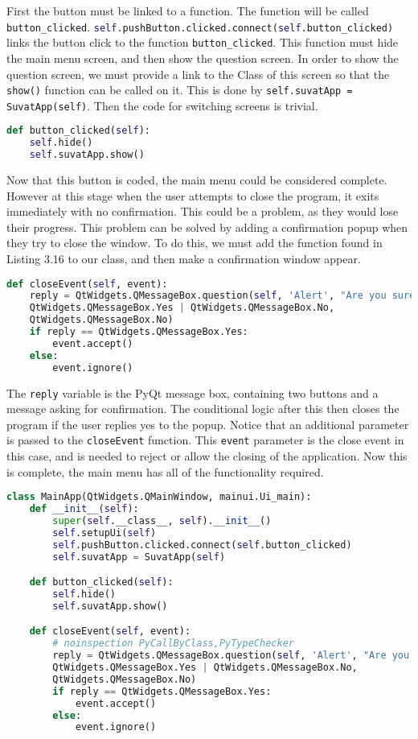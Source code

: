 First the button must be linked to a function. The function will be called \texttt{button\_clicked}. \lstinline[language=Python]|self.pushButton.clicked.connect(self.button_clicked)| links the button click to the function \texttt{button\_clicked}. This function must hide the main menu screen, and then show the question screen. In order to show the question screen, we must provide a link to the Class of this screen so that the \texttt{show()} function can be called on it. This is done by \lstinline|self.suvatApp = SuvatApp(self)|. Then the code for switching screens is trivial.
\begin{lstlisting}[language=Python, caption=GUI screen switch function]
def button_clicked(self):
	self.hide()
	self.suvatApp.show()
\end{lstlisting}
Now that this button is coded, the main menu could be considered complete. However at this stage when the user attempts to close the program, it exits immediately with no confirmation. This could be a problem, as they would lose their progress. This problem can be solved by adding a confirmation popup when they try to close the window.  To do this, we must add the function found in Listing 3.16 to our class, and then make a confirmation window appear.
\begin{lstlisting}[language=Python, caption=Window close confirmation function]
def closeEvent(self, event):
	reply = QtWidgets.QMessageBox.question(self, 'Alert', "Are you sure about that?",
	QtWidgets.QMessageBox.Yes | QtWidgets.QMessageBox.No,
	QtWidgets.QMessageBox.No)
	if reply == QtWidgets.QMessageBox.Yes:
		event.accept()
	else:
		event.ignore()
\end{lstlisting}
The \texttt{reply} variable is the PyQt message box, containing two buttons and a message asking for confirmation. The conditional logic after this then closes the program if the user replies yes to the popup. Notice that an additional parameter is passed to the \texttt{closeEvent} function. This \texttt{event} parameter is the close event in this case, and is needed to reject or allow the closing of the application. Now this is complete, the main menu has all of the functionality required.

\begin{lstlisting}[language=Python, caption=Final code for the main menu]
class MainApp(QtWidgets.QMainWindow, mainui.Ui_main):
	def __init__(self):
		super(self.__class__, self).__init__()
		self.setupUi(self)
		self.pushButton.clicked.connect(self.button_clicked)
		self.suvatApp = SuvatApp(self)

	def button_clicked(self):
		self.hide()
		self.suvatApp.show()

	def closeEvent(self, event):
		# noinspection PyCallByClass,PyTypeChecker
		reply = QtWidgets.QMessageBox.question(self, 'Alert', "Are you sure about that?",
		QtWidgets.QMessageBox.Yes | QtWidgets.QMessageBox.No,
		QtWidgets.QMessageBox.No)
		if reply == QtWidgets.QMessageBox.Yes:
			event.accept()
		else:
			event.ignore()

\end{lstlisting}
